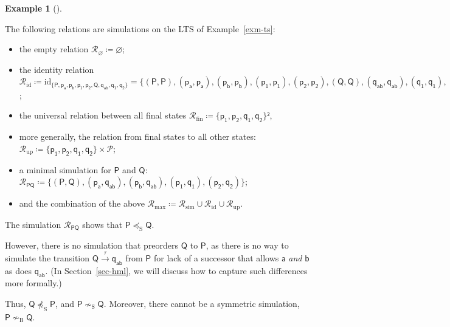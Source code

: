 \documentclass[
  a4paper,
]{report}
\providecommand{\tightlist}{%
  \setlength{\itemsep}{0pt}\setlength{\parskip}{0pt}}\usepackage{longtable,booktabs,array}
\theoremstyle{plain}
\theoremstyle{plain}
\theoremstyle{definition}
\theoremstyle{plain}
\theoremstyle{definition}
\newtheorem{example}{Example}[section]
\theoremstyle{remark}
\begin{document}
\begin{example}[]\protect\hypertarget{exm-phil-sim}{}\label{exm-phil-sim}

The following relations are simulations on the LTS of
Example~\ref{exm-ts}:

\begin{itemize}
\tightlist
\item
  the empty relation \(\mathcal{R}_\varnothing ≔ \varnothing\);
\item
  the identity relation
  \(\mathcal{R}_\mathrm{id} ≔ \mathrm{id}_{\{\mathsf{P}, \mathsf{p_a}, \mathsf{p_b}, \mathsf{p_1}, \mathsf{p_2}, \mathsf{Q}, \mathsf{q_{ab}}, \mathsf{q_1}, \mathsf{q_2}\}} = \{(\mathsf{P}, \mathsf{P}),\allowbreak (\mathsf{p_a}, \mathsf{p_a}),\allowbreak (\mathsf{p_b}, \mathsf{p_b}), (\mathsf{p_1}, \mathsf{p_1}),\allowbreak (\mathsf{p_2}, \mathsf{p_2}), (\mathsf{Q}, \mathsf{Q}), (\mathsf{q_{ab}}, \mathsf{q_{ab}}), \allowbreak(\mathsf{q_1}, \mathsf{q_1}), (\mathsf{q_2}, \mathsf{q_2})\}\);
\item
  the universal relation between all final states
  \(\mathcal{R}_\mathrm{fin} ≔ \{\mathsf{p_1}, \mathsf{p_2}, \mathsf{q_1}, \mathsf{q_2}\}²\),
\item
  more generally, the relation from final states to all other states:
  \(\mathcal{R}_\mathrm{up} ≔ \{\mathsf{p_1}, \mathsf{p_2}, \mathsf{q_1}, \mathsf{q_2}\} × \mathcal{P}\);
\item
  a minimal simulation for \(\mathsf{P}\) and \(\mathsf{Q}\):
  \(\mathcal{R}_\mathsf{PQ} ≔ \{(\mathsf{P}, \mathsf{Q}), (\mathsf{p_a}, \mathsf{q_{ab}}), (\mathsf{p_b}, \mathsf{q_{ab}}), (\mathsf{p_1}, \mathsf{q_1}), (\mathsf{p_2}, \mathsf{q_2})\}\);
\item
  and the combination of the above
  \(\mathcal{R}_\mathrm{max} ≔ \mathcal{R}_\mathrm{sim} ∪ \mathcal{R}_\mathrm{id} ∪ \mathcal{R}_\mathrm{up}\).
\end{itemize}

\noindent  The simulation \(\mathcal{R}_\mathsf{PQ}\) shows that
\(\mathsf{P} \preceq_\mathrm{S} \mathsf{Q}\).

However, there is no simulation that preorders \(\mathsf{Q}\) to
\(\mathsf{P}\), as there is no way to simulate the transition
\(\mathsf{Q} \xrightarrow{τ} \mathsf{q_{ab}}\) from \(\mathsf{P}\) for
lack of a successor that allows \(\mathsf{a}\) \emph{and} \(\mathsf{b}\)
as does \(\mathsf{q_{ab}}\). (In Section~\ref{sec-hml}, we will discuss
how to capture such differences more formally.)

Thus, \(\mathsf{Q} \not\preceq_\mathrm{S} \mathsf{P}\), and
\(\mathsf{P} \nsim_\mathrm{S} \mathsf{Q}\). Moreover, there cannot be a
symmetric simulation, \(\mathsf{P} \nsim_\mathrm{B} \mathsf{Q}\).

\end{example}
\end{document}
